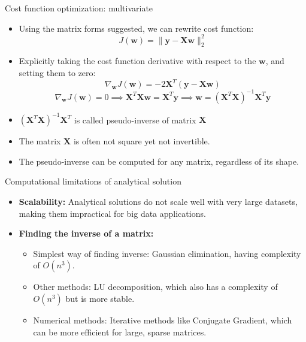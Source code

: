 \documentclass[serif, aspectratio=169]{beamer}
\begin{document}
\begin{frame}{Cost function optimization: multivariate}
    
    \begin{itemize}
        \item Using the matrix forms suggested, we can rewrite cost function:
        \[
        J(\mathbf{w}) = \| \mathbf{y} - \mathbf{Xw} \|_2^2
        \]
        \item Explicitly taking the cost function derivative with respect to the \( \mathbf{w} \), and setting them to zero:
        \[
        \nabla_{\mathbf{w}} J(\mathbf{w}) = -2 \mathbf{X}^T \left( \mathbf{y} - \mathbf{Xw} \right)
        \]
        \[
        \nabla_{\mathbf{w}} J(\mathbf{w}) = 0 \implies \mathbf{X}^T \mathbf{Xw} = \mathbf{X}^T \mathbf{y} \implies \mathbf{w} = \left( \mathbf{X}^T \mathbf{X} \right)^{-1} \mathbf{X}^T \mathbf{y}
        \]
    \end{itemize}


    \begin{itemize}
        \item \( \left(\mathbf{X}^T \mathbf{X} \right)^{-1} \mathbf{X}^T \) is called pseudo-inverse of matrix \( \mathbf{X} \)
        \item The matrix \( \mathbf{X} \) is often not square yet not invertible. \item The pseudo-inverse can be computed for any matrix, regardless of its shape.
    \end{itemize}
\end{frame}

\begin{frame}{Computational limitations of analytical solution}
    \begin{itemize}
        \item \textbf{Scalability:} Analytical solutions do not scale well with very large datasets, making them impractical for big data applications.
        \item \textbf{Finding the inverse of a matrix:}
        \begin{itemize}
            \item Simplest way of finding inverse: Gaussian elimination, having complexity of \(O(n^3)\).
            \item Other methods: LU decomposition, which also has a complexity of \(O(n^3)\) but is more stable.
            \item Numerical methods: Iterative methods like Conjugate Gradient, which can be more efficient for large, sparse matrices.
        \end{itemize}
    \end{itemize}
\end{frame}
\end{document}
